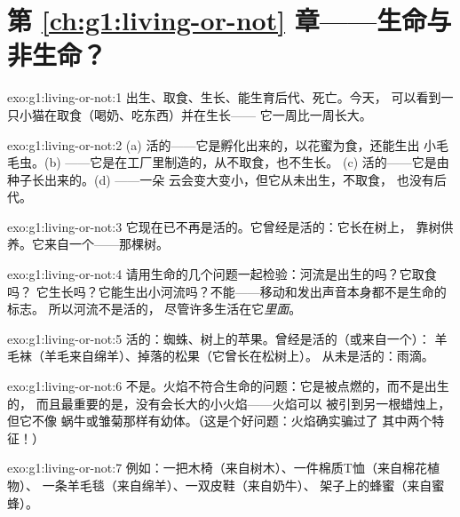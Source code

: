 \section*{第 \ref{ch:g1:living-or-not} 章——生命与非生命？}

\begin{solution}{exo:g1:living-or-not:1}
出生、取食、生长、能生育后代、死亡。今天，
可以看到一只小猫在取食（喝奶、吃东西）并在生长——
它一周比一周长大。
\end{solution}

\begin{solution}{exo:g1:living-or-not:2}
(a) 活的——它是孵化出来的，以花蜜为食，还能生出
小毛毛虫。(b) ——它是在工厂里制造的，从不取食，也不生长。
(c) 活的——它是由种子长出来的。(d) ——一朵
云会变大变小，但它从未出生，不取食，
也没有后代。
\end{solution}

\begin{solution}{exo:g1:living-or-not:3}
它现在已不再是活的。它曾经是活的：它长在树上，
靠树供养。它来自一个——那棵树。
\end{solution}

\begin{solution}{exo:g1:living-or-not:4}
请用生命的几个问题一起检验：河流是出生的吗？它取食吗？
它生长吗？它能生出小河流吗？不能——移动和发出声音本身都不是生命的标志。
所以河流不是活的，
尽管许多生活在它\emph{里面}。
\end{solution}

\begin{solution}{exo:g1:living-or-not:5}
活的：蜘蛛、树上的苹果。曾经是活的（或来自一个）：
羊毛袜（羊毛来自绵羊）、掉落的松果（它曾长在松树上）。
从未是活的：雨滴。
\end{solution}

\begin{solution}{exo:g1:living-or-not:6}
不是。火焰不符合生命的问题：它是被点燃的，而不是出生的，
而且最重要的是，没有会长大的小火焰——火焰可以
被引到另一根蜡烛上，但它不像
蜗牛或雏菊那样有幼体。（这是个好问题：火焰确实骗过了
其中两个特征！）
\end{solution}

\begin{solution}{exo:g1:living-or-not:7}
例如：一把木椅（来自树木）、一件棉质T恤（来自棉花植物）、
一条羊毛毯（来自绵羊）、一双皮鞋（来自奶牛）、
架子上的蜂蜜（来自蜜蜂）。
\end{solution}

